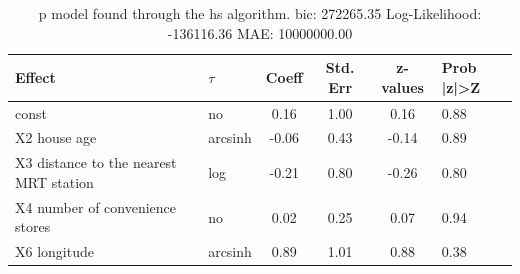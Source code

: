 \begin{table}
	\caption{p model found through the hs algorithm. bic: 272265.35 Log-Likelihood: -136116.36 MAE: 10000000.00}
	\begin{center}
		\begin{tabular}{|l|l|c|c|c|l|}
			\hline
			Effect & $\tau$ & Coeff & Std. Err & z-values & Prob |z|>Z \\
			\hline
			const & no & 0.16 & 1.00 & 0.16 & 0.88 \\
			\hline
			X2 house age & arcsinh & -0.06 & 0.43 & -0.14 & 0.89 \\
			\hline
			X3 distance to the nearest MRT station & log & -0.21 & 0.80 & -0.26 & 0.80 \\
			\hline
			X4 number of convenience stores & no & 0.02 & 0.25 & 0.07 & 0.94 \\
			\hline
			X6 longitude & arcsinh & 0.89 & 1.01 & 0.88 & 0.38 \\
			\hline
		\end{tabular}
	\end{center}
\end{table}
